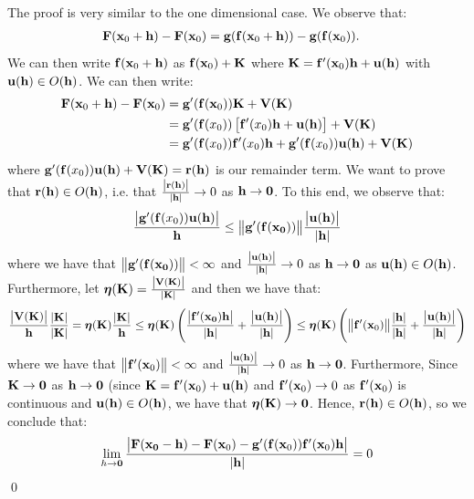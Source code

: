 \begin{nproof}
    The proof is very similar to the one dimensional case. We observe that:
    \begin{align*}
        \mathbf{F}(\mathbf{x}_0 + \mathbf{h}) - \mathbf{F}(\mathbf{x}_0) &= \mathbf{g}(\mathbf{f}(\mathbf{x}_0 + \mathbf{h})) - \mathbf{g}(\mathbf{f}(\mathbf{x}_0)).
    \end{align*}
    We can then write $\mathbf{f}(\mathbf{x}_0 + \mathbf{h})$ as $\mathbf{f}(\mathbf{x}_0) + \mathbf{K}$ where $\mathbf{K} = \mathbf{f}'(\mathbf{x}_0)\mathbf{h} + \mathbf{u}(\mathbf{h})$ with $\mathbf{u}(\mathbf{h}) \in O(\mathbf{h})$. We can then write:
    \begin{align*}
        \mathbf{F}(\mathbf{x}_0 + \mathbf{h}) - \mathbf{F}(\mathbf{x}_0) &= \mathbf{g}'(\mathbf{f}(\mathbf{x}_0))\mathbf{K} + \mathbf{V}(\mathbf{K})
        \\ &= \mathbf{g}'(\mathbf{f}(x_0))\left[\mathbf{f}'(x_0)\mathbf{h} + \mathbf{u}(\mathbf{h})\right] + \mathbf{V}(\mathbf{K})
        \\ &= \mathbf{g}'(\mathbf{f}(x_0))\mathbf{f}'(x_0)\mathbf{h} + \mathbf{g}'(\mathbf{f}(x_0))\mathbf{u}(\mathbf{h}) + \mathbf{V}(\mathbf{K})
    \end{align*} 
    where $\mathbf{g}'(\mathbf{f}(x_0))\mathbf{u}(\mathbf{h}) + \mathbf{V}(\mathbf{K}) = \mathbf{r}(\mathbf{h})$ is our remainder term. We want to prove that $\mathbf{r}(\mathbf{h})  \in O(\mathbf{h})$, i.e. that $\frac{\abs{\mathbf{r}(\mathbf{h})}}{\abs{\mathbf{h}}} \rightarrow 0$ as $\mathbf{h} \rightarrow \mathbf{0}$. To this end, we observe that:
    \begin{align*}
        \frac{\abs{\mathbf{g}'(\mathbf{f}(x_0))\mathbf{u}(\mathbf{h})}}{\mathbf{h}} \leq \norm{\mathbf{g}'(\mathbf{f}(\mathbf{x_0}))}\frac{\abs{\mathbf{u}(\mathbf{h})}}{\abs{\mathbf{h}}}
    \end{align*}
    where we have that $\norm{\mathbf{g}'(\mathbf{f}(\mathbf{x_0}))} < \infty$ and $\frac{\abs{\mathbf{u}(\mathbf{h})}}{\abs{\mathbf{h}}} \rightarrow 0$ as $\mathbf{h} \rightarrow \mathbf{0}$ as $\mathbf{u}(\mathbf{h}) \in O(\mathbf{h})$. Furthermore, let $\mbox{\boldmath$ \eta $}(\mathbf{K}) = \frac{\abs{\mathbf{V}(\mathbf{K})}}{\abs{\mathbf{K}}}$ and then we have that:
    \begin{align*}
        \frac{\abs{\mathbf{V}(\mathbf{K})}}{\mathbf{h}}\frac{\abs{\mathbf{K}}}{\abs{\mathbf{K}}} = \mbox{\boldmath$ \eta $}(\mathbf{K})\frac{\abs{\mathbf{K}}}{\mathbf{h}} \leq \mbox{\boldmath$ \eta $}(\mathbf{K})\left(\frac{\abs{\mathbf{f'(x_0)\mathbf{h}}}}{\abs{\mathbf{h}}} + \frac{\abs{\mathbf{u}(\mathbf{h})}}{\abs{\mathbf{h}}}\right) \leq \mbox{\boldmath$ \eta $}(\mathbf{K})\left(\norm{\mathbf{f}'(\mathbf{x}_0)}\frac{\abs{\mathbf{h}}}{\abs{\mathbf{h}}} + \frac{\abs{\mathbf{u}(\mathbf{h})}}{\abs{\mathbf{h}}}\right)
    \end{align*}
    where we have that $\norm{\mathbf{f}'(\mathbf{x}_0)} < \infty$ and $\frac{\abs{\mathbf{u}(\mathbf{h})}}{\abs{\mathbf{h}}} \rightarrow 0$ as $\mathbf{h} \rightarrow \mathbf{0}$. Furthermore, Since $\mathbf{K} \rightarrow \mathbf{0}$ as $\mathbf{h} \rightarrow \mathbf{0}$ (since $\mathbf{K} = \mathbf{f}'(\mathbf{x}_0) + \mathbf{u}(\mathbf{h})$ and $\mathbf{f}'(\mathbf{x}_0) \rightarrow 0$ as $\mathbf{f}'(\mathbf{x}_0)$ is continuous and $\mathbf{u}(\mathbf{h}) \in O(\mathbf{h})$, we have that $\mbox{\boldmath$ \eta $}(\mathbf{K}) \rightarrow \mathbf{0}$. Hence, $\mathbf{r}(\mathbf{h}) \in O(\mathbf{h})$, so we conclude that:
    \begin{align*}
        \lim_{h \rightarrow \mathbf{0}} \frac{\abs{\mathbf{F}(\mathbf{x_0} - \mathbf{h}) - \mathbf{F}(\mathbf{x}_0) - \mathbf{g}'(\mathbf{f}(\mathbf{x}_0))\mathbf{f}'(\mathbf{x}_0)\mathbf{h}}}{\abs{\mathbf{h}}} = 0
    \end{align*} \qed
\end{nproof}

